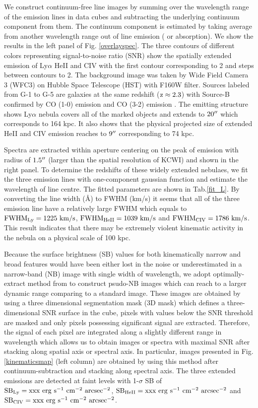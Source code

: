 We construct continuum-free line images by summing over the wavelength range of the emission lines in data cubes and subtracting the underlying continuum component from them. The continuum component is estimated by taking average from another wavelength range out of line emission ( or absorption). We show the results in the left panel of Fig. \ref{overlayspec}. The three contours of different colors representing signal-to-noise ratio (SNR) show the spatially extended emission of Ly$\alpha$ HeII and CIV with the first contour corresponding to 2 and steps between contours to 2. The background image was taken by Wide Field Camera 3 (WFC3) on Hubble Space Telescope (HST) with F160W filter. Sources labeled from G-1 to G-5 are galaxies at the same redshift ($\rm z \approx 2.3$) with Source-B confirmed by CO (1-0) emission and CO (3-2) emission \citep{emonts2019cold,qiongli2020}. The emitting structure shows Ly$\alpha$ nebula covers all of the marked objects and extends to $\rm 20\mbox{$^{\prime\prime}$}$ which corresponds to 164 kpc. It also shows that the physical projected size of extended HeII and CIV emission reaches to $9 \mbox{$^{\prime\prime}$}$ corresponding to 74 kpc.

Spectra are extracted within aperture centering on the peak of emission with radius of $1.5\mbox{$^{\prime\prime}$}$ (larger than the spatial resolution of KCWI) and shown in the right panel. To determine the redshifts of these widely extended nebulaes, we fit the three emission lines with one-component gaussian function and estimate the wavelength of line centre. The fitted parameters are shown in Tab.\ref{fit_L}. By converting the line width (\AA) to FWHM (km/s) it seems that all of the three emission line have a relatively large FWHM which equals to $\rm FWHM_{Ly}=1225 \ km/s$, $\rm FWHM_{HeII}=1039 \ km/s$ and $\rm FWHM_{CIV}=1786 \ km/s$. This result indicates that there may be extremely violent kinematic activity in the nebula on a physical scale of 100 kpc.

Because the surface brightness (SB) values for both kinematically narrow and broad features would have been either lost in the noise or underestimated in a narrow-band (NB) image with single width of wavelength, we adopt optimally-extract method from \citet{borisova2016ubiquitous} to construct psudo-NB images which can reach to a larger dynamic range comparing to a standard image. These images are obtained by using a three dimensional segmentation mask (3D mask) which defines a three-dimensional SNR surface in the cube, pixels with values below the SNR threshold are masked and only pixels possessing significant signal are extracted. Therefore, the signal of each pixel are integrated along a slightly different range in wavelength which allows us to obtain images or spectra with maximal SNR after stacking along spatial axis or spectral axis. In particular, images presented in Fig. \ref{kinematicsmap} (left column) are obtained by using this method after continuum-subtraction and stacking along spectral axis. The three extended emissions are detected at faint levels with 1-$\sigma$ SB of $\rm SB_{Ly}=xxx \ erg \ s^{-1} \ cm^{-2} \ arcsec^{-2}$, $\rm SB_{HeII}=xxx \ erg \ s^{-1} \ cm^{-2} \ arcsec^{-2}$ and $\rm SB_{CIV}=xxx \ erg \ s^{-1} \ cm^{-2} \ arcsec^{-2}$. 


